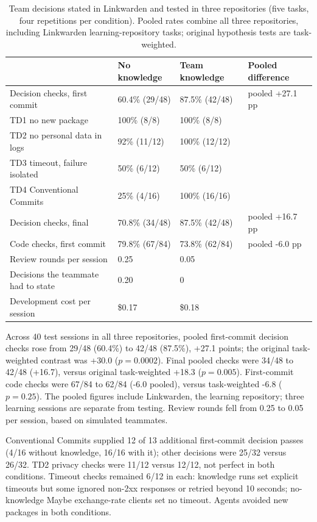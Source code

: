 \begin{table}[htbp]
\centering
\caption[Team-decision outcomes across three repositories.]{Team decisions stated in Linkwarden and tested in three repositories (five tasks, four repetitions per condition). Pooled rates combine all three repositories, including Linkwarden learning-repository tasks; original hypothesis tests are task-weighted.}
\label{tab:v4}
\small
\setlength{\tabcolsep}{4pt}
\begin{tabularx}{\linewidth}{@{}p{5cm}YYY@{}}
\toprule
& No knowledge & Team knowledge & Pooled difference \\
\midrule
Decision checks, first commit & 60.4\% (29/48) & 87.5\% (42/48) & pooled +27.1 pp \\
\quad TD1 no new package & 100\% (8/8) & 100\% (8/8) & \\
\quad TD2 no personal data in logs & 92\% (11/12) & 100\% (12/12) & \\
\quad TD3 timeout, failure isolated & 50\% (6/12) & 50\% (6/12) & \\
\quad TD4 Conventional Commits & 25\% (4/16) & 100\% (16/16) & \\
Decision checks, final & 70.8\% (34/48) & 87.5\% (42/48) & pooled +16.7 pp \\
Code checks, first commit & 79.8\% (67/84) & 73.8\% (62/84) & pooled -6.0 pp \\
Review rounds per session & 0.25 & 0.05 & \\
Decisions the teammate had to state & 0.20 & 0 & \\
Development cost per session & \$0.17 & \$0.18 & \\
\bottomrule
\end{tabularx}
\end{table}

Across 40 test sessions in all three repositories, pooled first-commit decision checks rose from 29/48 (60.4\%) to 42/48 (87.5\%), +27.1 points; the original task-weighted contrast was +30.0 ($p=0.0002$). Final pooled checks were 34/48 to 42/48 (+16.7), versus original task-weighted +18.3 ($p=0.005$). First-commit code checks were 67/84 to 62/84 (-6.0 pooled), versus task-weighted -6.8 ($p=0.25$). The pooled figures include Linkwarden, the learning repository; three learning sessions are separate from testing. Review rounds fell from 0.25 to 0.05 per session, based on simulated teammates.

Conventional Commits supplied 12 of 13 additional first-commit decision passes (4/16 without knowledge, 16/16 with it); other decisions were 25/32 versus 26/32. TD2 privacy checks were 11/12 versus 12/12, not perfect in both conditions. Timeout checks remained 6/12 in each: knowledge runs set explicit timeouts but some ignored non-2xx responses or retried beyond 10 seconds; no-knowledge Maybe exchange-rate clients set no timeout. Agents avoided new packages in both conditions.

